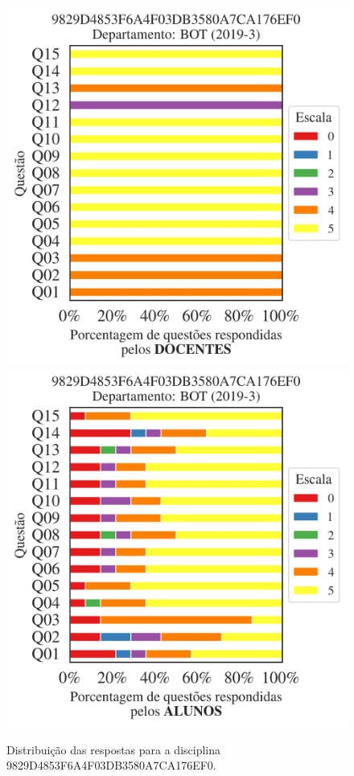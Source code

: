 \documentclass[a4paper,10pt]{article}
\begin{document}
\begin{figure}[h]
\centering
\includegraphics[width=0.485\linewidth]{analise_disciplina_departamento_BOT_9829D4853F6A4F03DB3580A7CA176EF0_docentes.png}
\includegraphics[width=0.485\linewidth]{analise_disciplina_departamento_BOT_9829D4853F6A4F03DB3580A7CA176EF0_alunos.png}
\caption{\label{fig:analise_geral_departamento}                Distribuição das respostas para a disciplina 9829D4853F6A4F03DB3580A7CA176EF0. }
\end{figure}
\end{document}

